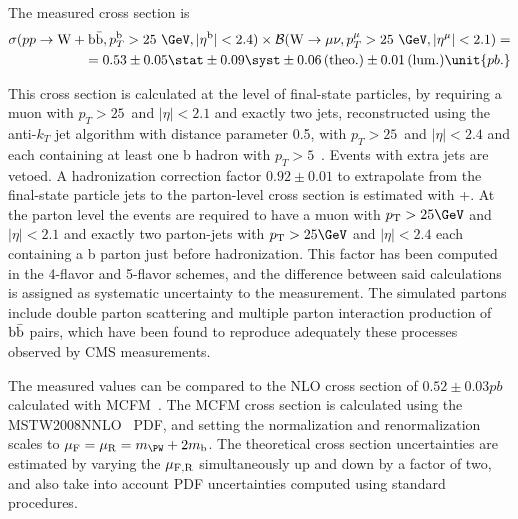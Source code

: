 The measured cross section is
\begin{eqnarray*}
\sigma(pp\rightarrow \mathrm{W} + \bbbar, p_T^{\mathrm{b}}>25~\GeV, |\eta^{\mathrm{b}}|<2.4)\times{\cal{B}}(\Wmn, p_T^{\mu}>25~\GeV, |\eta^\mu|<2.1) = \\
            =0.53\pm  0.05\stat \pm 0.09 \syst \pm 0.06 \theo \pm 0.01\lumi \unit{pb.} %
\end{eqnarray*}

This cross section is calculated at the level of final-state particles, by requiring a muon with $p_T>25$~\GeV and $|\eta|<2.1$ and
exactly two jets, reconstructed using the anti-$k_T$ jet algorithm with distance parameter 0.5, with $p_T>25$~\GeV and $|\eta|<2.4$ and
each containing at least one b hadron with $p_T>5$~\GeV. Events with extra jets are vetoed.
A hadronization correction factor $0.92\pm0.01$ to extrapolate from the final-state particle jets 
to the parton-level cross section 
is estimated with \MADGRAPH+\PYTHIA. At the parton level the events are required to have a 
muon with
$\pt > 25\GeV$ and $|\eta|<2.1$ and exactly two parton-jets with
$\pt > 25\GeV$ and $|\eta|<2.4$ each containing a b parton just before hadronization. This factor has been computed in the 4-flavor and 5-flavor
schemes, and the difference between said calculations is assigned as systematic uncertainty to the measurement.
The simulated partons include double parton scattering and multiple parton interaction 
production of $\mathrm{b\bar{b}}$ pairs, which have been found to reproduce adequately these 
processes observed by CMS measurements. 

The measured values can be compared to the NLO cross section of
$0.52 \pm 0.03\unit{pb}$ 
calculated with MCFM~\cite{Campbell:2010ff, Badger:2010mg}.
The MCFM cross section is calculated using the MSTW2008NNLO~\cite{Martin:2009iq} PDF, and 
setting the normalization and renormalization scales to $\mu_{\rm{F}} = \mu_{\rm{R}} = m_{\PW} + 2m_{\rm{b}}$.
The theoretical cross section uncertainties
are estimated by varying the $\mu_{\rm{F,R}}$ simultaneously up and down by a factor of two, and also take
into account PDF uncertainties computed using standard procedures.

